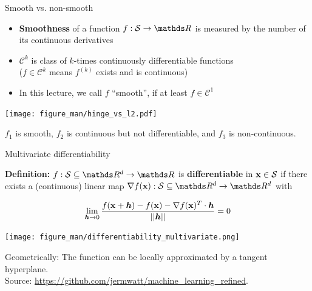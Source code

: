\documentclass[11pt,compress,t,notes=noshow, xcolor=table]{beamer}
\begin{document}
\begin{vbframe}{Smooth vs. non-smooth}

\begin{itemize}
    \item \textbf{Smoothness} of a function  $f: \mathcal{S} \to \R$ is measured by the number of its continuous derivatives
    \item $\mathcal{C}^k$ is class of $k$-times continuously differentiable functions \\
        ($f\in\mathcal{C}^k$ means $f^{(k)}$ exists and is continuous)
    \item In this lecture, we call $f$ \enquote{smooth}, if at least $f \in \mathcal{C}^1$
\end{itemize}


\begin{center}
\texttt{[image: figure\_man/hinge\_vs\_l2.pdf]} \\ 
\begin{footnotesize}
$f_1$ is smooth, $f_2$ is continuous but not differentiable, and $f_3$ is non-continuous. 
\end{footnotesize}
\end{center}


\end{vbframe}

\begin{vbframe}{Multivariate differentiability}

\textbf{Definition:} $f: \mathcal{S}\subseteq \R^d \to \R$ is \textbf{differentiable} in $\mathbf{x} \in \mathcal{S}$ if there exists a (continuous) linear map $\nabla f(\xv): \mathcal{S}\subseteq \R^d \to \R^d$ with %

$$
\lim_{\bm{h} \to 0} \frac{f(\mathbf{x} + \bm{h}) - f(\mathbf{x}) - \nabla f(\mathbf{x})^T \cdot \bm{h}}{||\bm{h}||} = 0
$$

\begin{center}
\texttt{[image: figure\_man/differentiability\_multivariate.png]} \\
\begin{footnotesize}
Geometrically: The function can be locally approximated by a tangent hyperplane. \\
Source: \url{https://github.com/jermwatt/machine_learning_refined}.
\end{footnotesize}
\end{center}

\end{vbframe}
\end{document}
